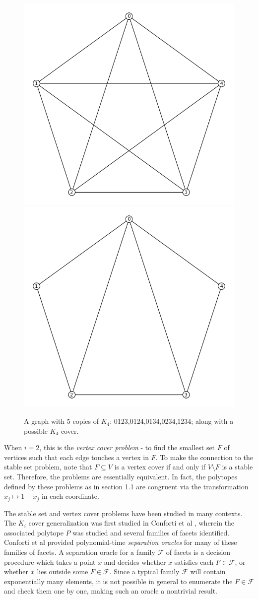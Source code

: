 \begin{figure}[htd]
	\centering
	\includegraphics[width=.4\textwidth,natwidth=613,natheight=584]{K5.png}
	\includegraphics[width=.4\textwidth,natwidth=613,natheight=584]{K4cover.png}
	\caption{A graph with 5 copies of $K_4$: 0123,0124,0134,0234,1234; along with a possible $K_4$-cover.}
	\label{K5}
\end{figure}

When $i=2$, this is the \emph{vertex cover problem} - to find the smallest
set $F$ of vertices such that each edge touches a vertex in $F$. To make the
connection to the stable set problem, note that $F \subseteq V$ is a vertex
cover if and only if $V \setminus F$ is a stable set.
Therefore, the problems are essentially equivalent. In fact, the polytopes
defined by these problems as in section 1.1 are congruent via the transformation
$x_j \mapsto 1-x_j$ in each coordinate.

The stable set and vertex cover problems have been studied in many contexts. 
The $K_i$ cover generalization was first studied in Conforti et al 
\cite{conforti}, wherein the associated polytope $P$ was 
studied and several families of facets identified. 
Conforti et al provided polynomial-time {\em separation oracles} for many of these families of facets. 
A separation oracle for a family $\mathcal{F}$ of facets is a decision procedure which takes a point $x$ and decides whether $x$ satisfies each $F \in \mathcal{F}$, or whether $x$ lies outside some $F \in \mathcal{F}$.
Since a typical family $\mathcal{F}$ will contain exponentially many elements, it is not possible in general to enumerate the $F \in \mathcal{F}$ and check them one by one, making such an oracle a nontrivial result.

